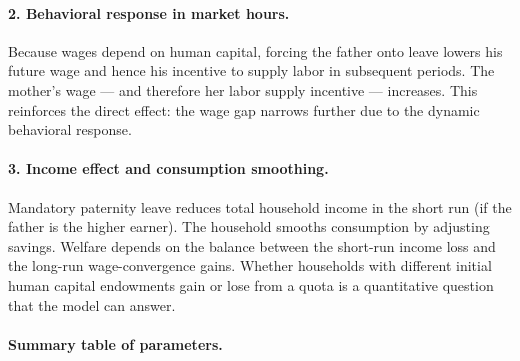 \paragraph{2. Behavioral response in market hours.}
Because wages depend on human capital, forcing the father onto leave lowers his future wage and hence his incentive to supply labor in subsequent periods. The mother's wage --- and therefore her labor supply incentive --- increases. This reinforces the direct effect: the wage gap narrows further due to the dynamic behavioral response.

\paragraph{3. Income effect and consumption smoothing.}
Mandatory paternity leave reduces total household income in the short run (if the father is the higher earner). The household smooths consumption by adjusting savings. Welfare depends on the balance between the short-run income loss and the long-run wage-convergence gains. Whether households with different initial human capital endowments gain or lose from a quota is a quantitative question that the model can answer.

\paragraph{Summary table of parameters.}

